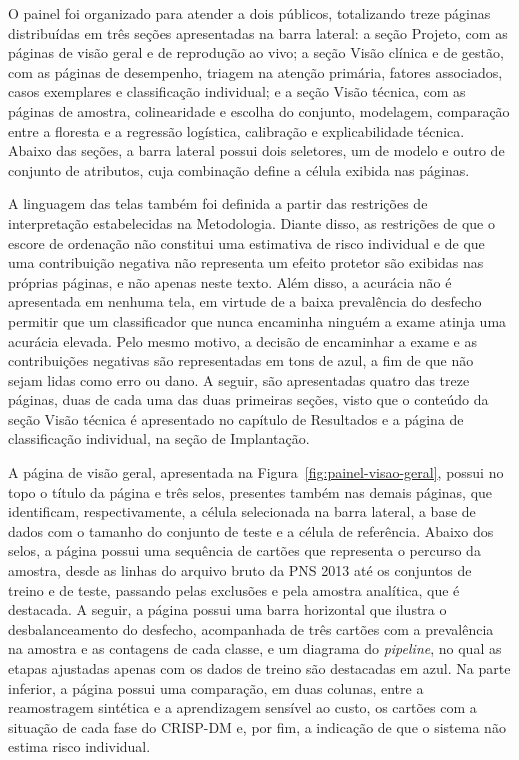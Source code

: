 O painel foi organizado para atender a dois públicos, totalizando treze páginas distribuídas em três seções apresentadas na barra lateral: a seção Projeto, com as páginas de visão geral e de reprodução ao vivo; a seção Visão clínica e de gestão, com as páginas de desempenho, triagem na atenção primária, fatores associados, casos exemplares e classificação individual; e a seção Visão técnica, com as páginas de amostra, colinearidade e escolha do conjunto, modelagem, comparação entre a floresta e a regressão logística, calibração e explicabilidade técnica. Abaixo das seções, a barra lateral possui dois seletores, um de modelo e outro de conjunto de atributos, cuja combinação define a célula exibida nas páginas.

A linguagem das telas também foi definida a partir das restrições de interpretação estabelecidas na Metodologia. Diante disso, as restrições de que o escore de ordenação não constitui uma estimativa de risco individual e de que uma contribuição negativa não representa um efeito protetor são exibidas nas próprias páginas, e não apenas neste texto. Além disso, a acurácia não é apresentada em nenhuma tela, em virtude de a baixa prevalência do desfecho permitir que um classificador que nunca encaminha ninguém a exame atinja uma acurácia elevada. Pelo mesmo motivo, a decisão de encaminhar a exame e as contribuições negativas são representadas em tons de azul, a fim de que não sejam lidas como erro ou dano. A seguir, são apresentadas quatro das treze páginas, duas de cada uma das duas primeiras seções, visto que o conteúdo da seção Visão técnica é apresentado no capítulo de Resultados e a página de classificação individual, na seção de Implantação.

A página de visão geral, apresentada na Figura~\ref{fig:painel-visao-geral}, possui no topo o título da página e três selos, presentes também nas demais páginas, que identificam, respectivamente, a célula selecionada na barra lateral, a base de dados com o tamanho do conjunto de teste e a célula de referência. Abaixo dos selos, a página possui uma sequência de cartões que representa o percurso da amostra, desde as linhas do arquivo bruto da PNS 2013 até os conjuntos de treino e de teste, passando pelas exclusões e pela amostra analítica, que é destacada. A seguir, a página possui uma barra horizontal que ilustra o desbalanceamento do desfecho, acompanhada de três cartões com a prevalência na amostra e as contagens de cada classe, e um diagrama do \textit{pipeline}, no qual as etapas ajustadas apenas com os dados de treino são destacadas em azul. Na parte inferior, a página possui uma comparação, em duas colunas, entre a reamostragem sintética e a aprendizagem sensível ao custo, os cartões com a situação de cada fase do CRISP-DM e, por fim, a indicação de que o sistema não estima risco individual.

